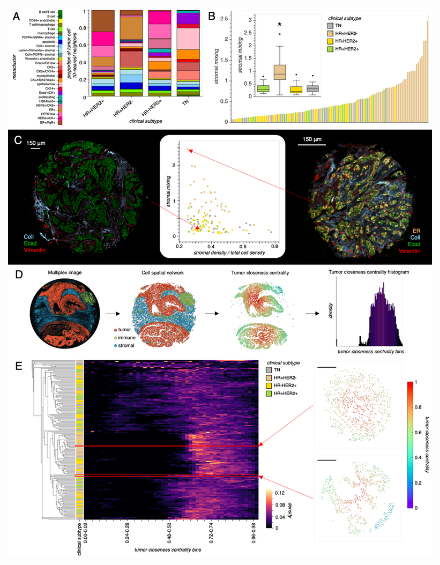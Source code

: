 \documentclass[preprint,review,3p,12pt]{elsarticle}
\begin{document}
\begin{figure}[p]
\centering\includegraphics[width=\linewidth,
                 keepaspectratio]{fig3_secondrevision}
\caption{}
\label{fig:fig3}
\end{figure}

\newpage
\end{document}
